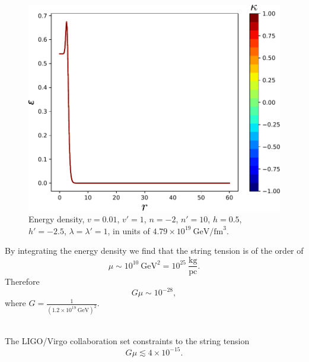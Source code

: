 \documentclass[14pt]{beamer}
\begin{document}
\begin{frame}
\begin{figure}
	\centering
	\includegraphics[scale=.5]{chapters/figures/n-2h05np10hp-25l1lp1v001vp1eden.pdf}
	\caption{Energy density, $v = 0.01$, $v'=1$, $n=-2$, $n'=10$, $h=0.5$, $h'=-2.5$, $\lambda=\lambda'=1$, in units of $4.79\times 10^{19}\ \text{GeV}/\text{fm}^3$.}
\end{figure}
\end{frame}

\begin{frame}
By integrating the energy density we find that the string tension is of the order of
\begin{equation*}
	\mu \sim 10^{10}\ \text{GeV}^2 = 10^{25} \ \frac{\text{kg}}{\text{pc}}.
\end{equation*}
Therefore
\begin{equation*}
	G\mu \sim 10^{-28},
\end{equation*}
where $G = \frac{1}{(1.2\times 10^{19}\ \text{GeV})^2}$.\\~\

The LIGO/Virgo collaboration set constraints to the string tension
\begin{equation*}
		G\mu \lesssim 4\times 10^{-15}.
	\end{equation*}		
\end{frame}
\end{document}
